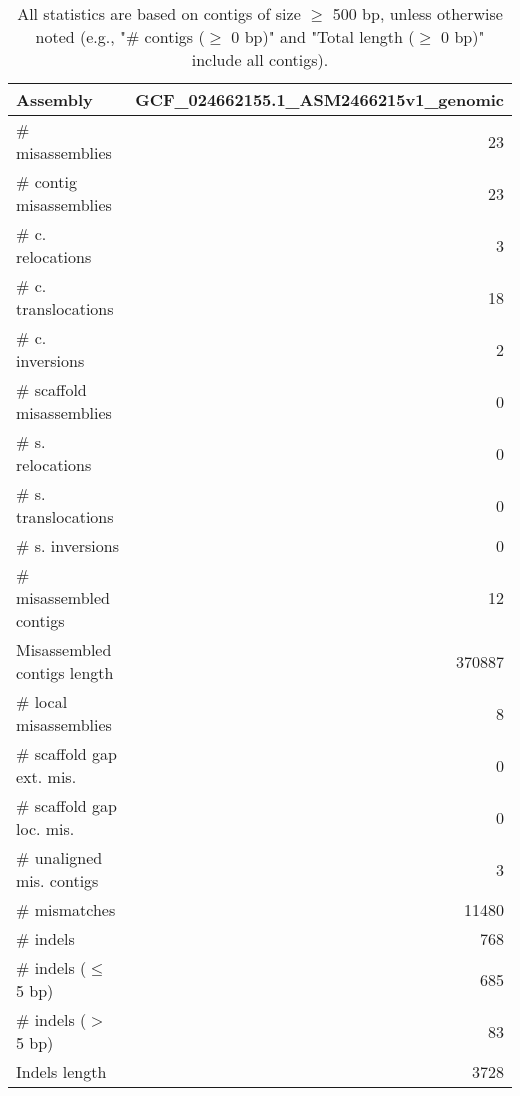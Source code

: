 \documentclass[12pt,a4paper]{article}
\begin{document}
\begin{table}[ht]
\begin{center}
\caption{All statistics are based on contigs of size $\geq$ 500 bp, unless otherwise noted (e.g., "\# contigs ($\geq$ 0 bp)" and "Total length ($\geq$ 0 bp)" include all contigs).}
\begin{tabular}{|l*{1}{|r}|}
\hline
Assembly & GCF\_024662155.1\_ASM2466215v1\_genomic \\ \hline
\# misassemblies & 23 \\ \hline
\hspace{2mm}\# contig misassemblies & 23 \\ \hline
\hspace{5mm}\# c. relocations & 3 \\ \hline
\hspace{5mm}\# c. translocations & 18 \\ \hline
\hspace{5mm}\# c. inversions & 2 \\ \hline
\hspace{2mm}\# scaffold misassemblies & 0 \\ \hline
\hspace{5mm}\# s. relocations & 0 \\ \hline
\hspace{5mm}\# s. translocations & 0 \\ \hline
\hspace{5mm}\# s. inversions & 0 \\ \hline
\# misassembled contigs & 12 \\ \hline
Misassembled contigs length & 370887 \\ \hline
\# local misassemblies & 8 \\ \hline
\# scaffold gap ext. mis. & 0 \\ \hline
\# scaffold gap loc. mis. & 0 \\ \hline
\# unaligned mis. contigs & 3 \\ \hline
\# mismatches & 11480 \\ \hline
\# indels & 768 \\ \hline
\hspace{5mm}\# indels ($\leq$ 5 bp) & 685 \\ \hline
\hspace{5mm}\# indels ($>$ 5 bp) & 83 \\ \hline
Indels length & 3728 \\ \hline
\end{tabular}
\end{center}
\end{table}
\end{document}
